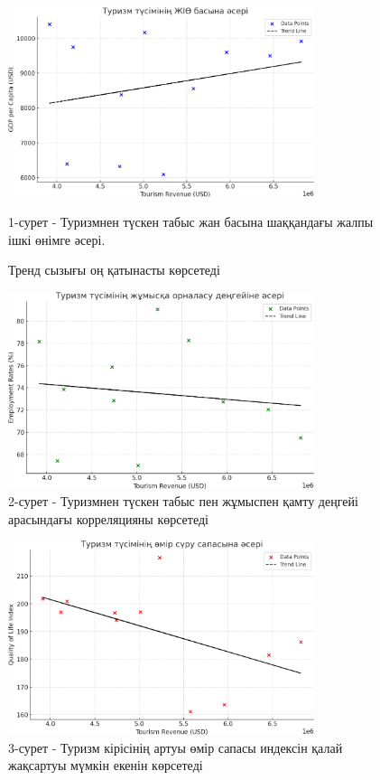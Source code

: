 \begin{figure}[H]
	\centering
	\includegraphics[width=0.8\textwidth]{assets/1114}
	\caption*{1-сурет - Туризмнен түскен табыс жан басына шаққандағы жалпы ішкі өнімге әсері.}
	\caption*{Тренд сызығы оң қатынасты көрсетеді}
\end{figure}

\begin{figure}[H]
	\centering
	\includegraphics[width=0.8\textwidth]{assets/1115}
	\caption*{2-сурет - Туризмнен түскен табыс пен жұмыспен қамту деңгейі арасындағы корреляцияны көрсетеді}
\end{figure}

\begin{figure}[H]
	\centering
	\includegraphics[width=0.8\textwidth]{assets/1116}
	\caption*{3-сурет - Туризм кірісінің артуы өмір сапасы индексін қалай жақсартуы мүмкін екенін көрсетеді}
\end{figure}

